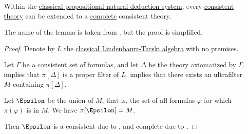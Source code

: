 \begin{lemma}\label{thm:extension_to_complete_consistent_set}
  Within the \hyperref[def:propositional_natural_deduction_system]{classical propositional natural deduction system}, every \hyperref[def:consistent_set_of_sentences]{consistent} \hyperref[def:logical_theory]{theory} can be extended to a \hyperref[def:complete_set_of_sentences]{complete} consistent theory.
\end{lemma}
\begin{comments}
  \item The name of the lemma is taken from , but the proof is simplified.
\end{comments}
\begin{proof}
  Denote by \( L \) the \hyperref[thm:lindenbaum_tarski_algebras]{classical Lindenbaum-Tarski algebra} with no premises.

  Let \( \Gamma \) be a consistent set of formulas, and let \( \Delta \) be the theory axiomatized by \( \Gamma \).  implies that \( \pi[\Delta] \) is a proper filter of \( L \).  implies that there exists an ultrafilter \( M \) containing \( \pi[\Delta] \).

  Let \( \Epsilon \) be the union of \( M \), that is, the set of all formulas \( \varphi \) for which \( \pi(\varphi) \) is in \( M \). We have \( \pi[\Epsilon] = M \).

  Then \( \Epsilon \) is a consistent due to , and complete due to .
\end{proof}
